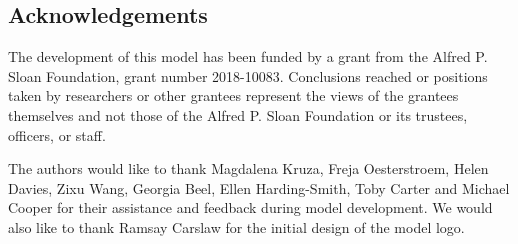\documentclass[a4paper]{refart}
\begin{document}
\subsection{Acknowledgements}
The development of this model has been funded by a grant from the Alfred P. Sloan Foundation, grant number 2018-10083. Conclusions reached or positions taken by researchers or other grantees represent the views of the grantees themselves and not those of the Alfred P. Sloan Foundation or its trustees, officers, or staff. 

The authors would like to thank Magdalena Kruza, Freja Oesterstroem, Helen Davies, Zixu Wang, Georgia Beel, Ellen Harding-Smith, Toby Carter and Michael Cooper for their assistance and feedback during model development. We would also like to thank Ramsay Carslaw for the initial design of the model logo.


\printindex

\printbibliography

\newpage
\appendix
\end{document}
